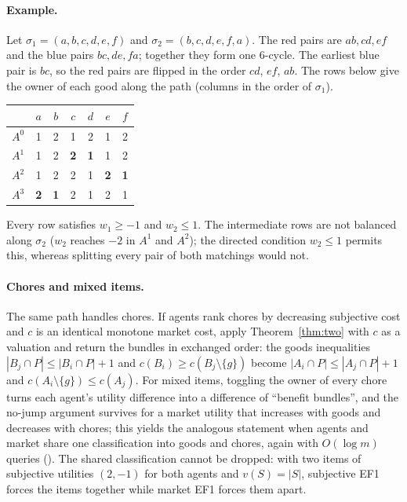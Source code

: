 \documentclass[sigconf,anonymous]{aamas}
\begin{document}
\paragraph{Example.} Let $\sigma_1=(a,b,c,d,e,f)$ and $\sigma_2=(b,c,d,e,f,a)$. The red pairs are $ab,cd,ef$ and the blue pairs $bc,de,fa$; together they form one 6-cycle. The earliest blue pair is $bc$, so the red pairs are flipped in the order $cd$, $ef$, $ab$. The rows below give the owner of each good along the path (columns in the order of $\sigma_1$).
\begin{center}\small
\begin{tabular}{@{}lcccccc@{}}
\toprule
 & $a$ & $b$ & $c$ & $d$ & $e$ & $f$\\
\midrule
$A^0$ & 1 & 2 & 1 & 2 & 1 & 2\\
$A^1$ & 1 & 2 & \textbf{2} & \textbf{1} & 1 & 2\\
$A^2$ & 1 & 2 & 2 & 1 & \textbf{2} & \textbf{1}\\
$A^3$ & \textbf{2} & \textbf{1} & 2 & 1 & 2 & 1\\
\bottomrule
\end{tabular}
\end{center}
Every row satisfies $w_1\ge-1$ and $w_2\le1$. The intermediate rows are not balanced along $\sigma_2$ ($w_2$ reaches $-2$ in $A^1$ and $A^2$); the directed condition $w_2\le1$ permits this, whereas splitting every pair of both matchings would not.

\paragraph{Chores and mixed items.}
The same path handles chores. If agents rank chores by decreasing subjective cost and $c$ is an identical monotone market cost, apply Theorem~\ref{thm:two} with $c$ as a valuation and return the bundles in exchanged order: the goods inequalities $|B_j\cap P|\le|B_i\cap P|+1$ and $c(B_i)\ge c(B_j\setminus\{g\})$ become $|A_i\cap P|\le|A_j\cap P|+1$ and $c(A_i\setminus\{g\})\le c(A_j)$. For mixed items, toggling the owner of every chore turns each agent's utility difference into a difference of ``benefit bundles'', and the no-jump argument survives for a market utility that increases with goods and decreases with chores; this yields the analogous statement when agents and market share one classification into goods and chores, again with $O(\log m)$ queries (\appTwo). The shared classification cannot be dropped: with two items of subjective utilities $(2,-1)$ for both agents and $v(S)=|S|$, subjective EF1 forces the items together while market EF1 forces them apart.
\end{document}
